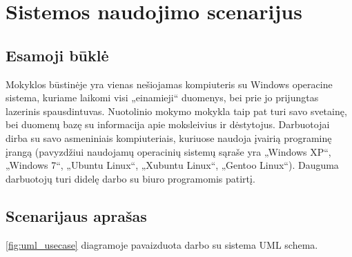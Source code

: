 \chapter{Sistemos naudojimo scenarijus}

\section{Esamoji būklė}

Mokyklos būstinėje yra vienas nešiojamas kompiuteris su Windows operacine
sistema, kuriame laikomi visi „einamieji“ duomenys, bei prie jo prijungtas 
lazerinis spausdintuvas. Nuotolinio mokymo mokykla taip pat turi savo 
svetainę, bei duomenų bazę su informacija apie moksleivius ir dėstytojus.
Darbuotojai dirba su savo asmeniniais kompiuteriais, kuriuose naudoja
įvairią programinę įrangą (pavyzdžiui naudojamų operacinių sistemų 
sąraše yra „Windows XP“, „Windows 7“, „Ubuntu Linux“, „Xubuntu Linux“,
„Gentoo Linux“). Dauguma darbuotojų turi didelę darbo su biuro 
programomis patirtį.

\section{Scenarijaus aprašas}

\ref{fig:uml_usecase} diagramoje pavaizduota darbo su sistema UML schema.



